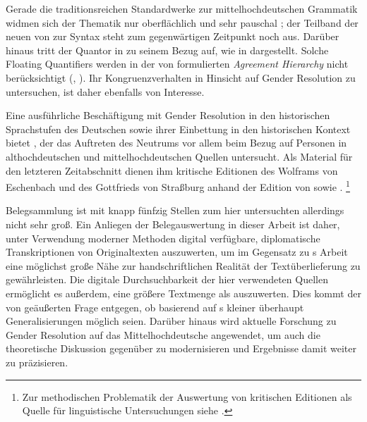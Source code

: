 Gerade die traditionsreichen Standard\-werke zur
mittelhochdeutschen Grammatik widmen sich der Thematik
nur oberflächlich und sehr pauschal \autocites(dazu
)[siehe][384]{paul2007}[188]{dal2014}; der
Teilband der neuen 
von \citeauthor*{ksw2} zur Syntax steht zum gegenwärtigen Zeitpunkt noch aus.
Darüber hinaus tritt der Quantor  in  zu
seinem Bezug auf, wie in  dargestellt. Solche Floating
Quantifiers \autocite{sportiche1988} werden in der von
\citet[204]{corbett1979} formulierten \textit{Agreement Hierarchy} nicht
berücksichtigt (, ). Ihr
Kongruenzverhalten in Hinsicht auf Gender Resolution zu untersuchen, ist daher
ebenfalls von Interesse.

Eine ausführliche Beschäftigung mit Gender Resolution in den
historischen Sprachstufen des Deutschen sowie ihrer Einbettung
in den historischen Kontext bietet \citet{askedal1973}, der das
Auftreten des Neutrums vor allem beim Bezug auf Personen in
althochdeutschen und
mittelhochdeutschen Quellen untersucht. Als Material für
den letzteren Zeitabschnitt dienen ihm kritische
Editionen des  Wolframs von
Eschenbach und des  Gottfrieds von
Straßburg anhand der Edition von
\citet{lachmannhartl1952} sowie \citet{maroldschroeder1969}.%
%
	\footnote{Zur methodischen Problematik der Auswertung von kritischen
		Editionen als Quelle für linguistische
		Untersuchungen siehe .}

 Belegsammlung ist mit knapp fünfzig Stellen zum hier
untersuchten  allerdings nicht sehr groß. Ein Anliegen der
Belegauswertung in dieser Arbeit ist daher, unter Verwendung moderner Methoden
digital verfügbare, diplomatische Transkriptionen von
Originaltexten auszuwerten, um im Gegensatz zu \citeauthor{askedal1973}s Arbeit
eine möglichst große Nähe zur handschriftlichen Realität der
Textüberlieferung zu gewährleisten. Die digitale
Durchsuchbarkeit der hier verwendeten Quellen ermöglicht es außerdem, eine
größere Textmenge als \citeauthor{askedal1973} auszuwerten. Dies kommt der von
\citet[118]{fleischerschallert2011} geäußerten Frage entgegen, ob basierend auf
\citeauthor{askedal1973}s kleiner
 überhaupt Generalisierungen möglich seien. Darüber hinaus wird
aktu\-elle Forschung zu Gender Resolution auf das
Mittelhochdeutsche angewendet, um auch die theoretische
Diskussion gegenüber \citet{askedal1973} zu modernisieren und Ergebnisse damit
weiter zu präzisieren.

